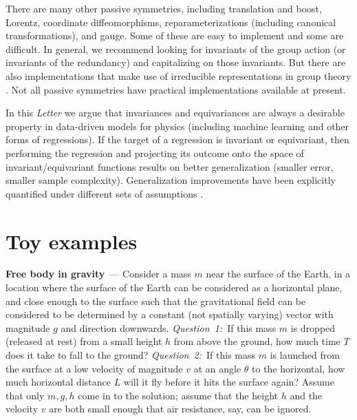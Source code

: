 \documentclass[11pt]{article}
\renewcommand{\paragraph}[1]{\medskip\par\noindent\textbf{#1}~---}
\newcommand{\documentname}{\textsl{Letter}}
\begin{document}
There are many other passive symmetries, including translation and boost, Lorentz, coordinate diffeomorphisms, reparameterizations (including canonical transformations), and gauge.
Some of these are easy to implement and some are difficult.
In general, we recommend looking for invariants of the group action (or invariants of the redundancy) and capitalizing on those invariants.
But there are also implementations that make use of irreducible representations in group theory \cite{fuchs2020se, thomas2018tensor, geiger2022e3nn}.
Not all passive symmetries have practical implementations available at present.

In this \documentname{} we argue that invariances and equivariances are always a desirable property in data-driven models for physics (including machine learning and other forms of regressions).
If the target of a regression is invariant or equivariant, then performing the regression and projecting its outcome onto the space of invariant/equivariant functions results on better generalization (smaller error, smaller sample complexity).
Generalization improvements have been explicitly quantified under different sets of assumptions \cite{bietti2021sample, elesedy2021provably, mei2021learning, elesedy2021kernel}. 

\section{Toy examples}

\paragraph{Free body in gravity}
Consider a mass $m$ near the surface of the Earth, in a location where the surface of the Earth can be considered as a horizontal plane, and close enough to the surface such that the gravitational field can be considered to be determined by a constant (not spatially varying) vector with magnitude $g$ and direction downwards.
\textsl{Question~1:}~If this mass $m$ is dropped (released at rest) from a small height $h$ from above the ground, how much time $T$ does it take to fall to the ground?
\textsl{Question~2:}~If this mass $m$ is launched from the surface at a low velocity of magnitude $v$ at an angle $\theta$ to the horizontal, how much horizontal distance $L$ will it fly before it hits the surface again?
Assume that only $m, g, h$ come in to the solution; assume that the height $h$ and the velocity $v$ are both small enough that air resistance, say, can be ignored.
\end{document}
